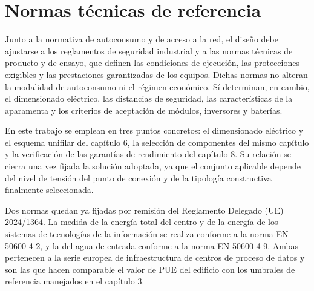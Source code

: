 
\section{Normas técnicas de referencia}
\label{sec:norm-tecnicas}

Junto a la normativa de autoconsumo y de acceso a la red, el diseño debe ajustarse a los reglamentos de seguridad industrial y a las normas técnicas de producto y de ensayo, que definen las condiciones de ejecución, las protecciones exigibles y las prestaciones garantizadas de los equipos. Dichas normas no alteran la modalidad de autoconsumo ni el régimen económico. Sí determinan, en cambio, el dimensionado eléctrico, las distancias de seguridad, las características de la aparamenta y los criterios de aceptación de módulos, inversores y baterías.

En este trabajo se emplean en tres puntos concretos: el dimensionado eléctrico y el esquema unifilar del capítulo 6, la selección de componentes del mismo capítulo y la verificación de las garantías de rendimiento del capítulo 8. Su relación se cierra una vez fijada la solución adoptada, ya que el conjunto aplicable depende del nivel de tensión del punto de conexión y de la tipología constructiva finalmente seleccionada.

Dos normas quedan ya fijadas por remisión del Reglamento Delegado (UE) 2024/1364. La medida de la energía total del centro y de la energía de los sistemas de tecnologías de la información se realiza conforme a la norma EN 50600-4-2, y la del agua de entrada conforme a la norma EN 50600-4-9. Ambas pertenecen a la serie europea de infraestructura de centros de proceso de datos y son las que hacen comparable el valor de \ac{PUE} del edificio con los umbrales de referencia manejados en el capítulo 3.

